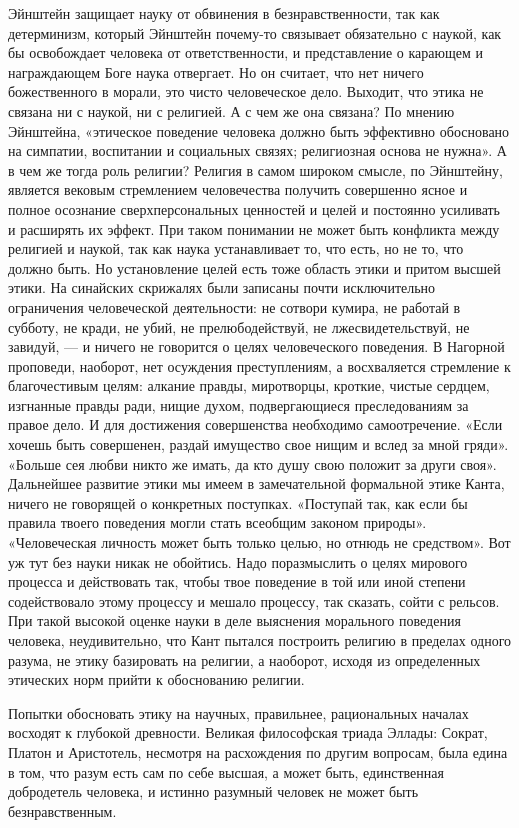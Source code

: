 Эйнштейн защищает науку от обвинения в безнравственности, так как детерминизм,
который Эйнштейн почему-то связывает обязательно с наукой, как бы освобождает
человека от ответственности, и представление о карающем и награждающем Боге
наука отвергает. Но он считает, что нет ничего божественного в морали, это
чисто человеческое дело. Выходит, что этика не связана ни с наукой, ни с
религией. А с чем же она связана? По мнению Эйнштейна, «этическое поведение
человека должно быть эффективно обосновано на симпатии, воспитании и социальных
связях; религиозная основа не нужна». А в чем же тогда роль религии? Религия в
самом широком смысле, по Эйнштейну, является вековым стремлением человечества
получить совершенно ясное и полное осознание сверхперсональных ценностей и
целей и постоянно усиливать и расширять их эффект. При таком понимании не может
быть конфликта между религией и наукой, так как наука устанавливает то, что
есть, но не то, что должно быть. Но установление целей есть тоже область этики
и притом высшей этики. На синайских
скрижалях были записаны почти исключительно ограничения человеческой
деятельности: не сотвори кумира, не работай в субботу, не кради, не убий, не
прелюбодействуй, не лжесвидетельствуй, не завидуй, --- и ничего не говорится о
целях человеческого поведения. В Нагорной проповеди, наоборот, нет осуждения
преступлениям, а восхваляется стремление к благочестивым целям: алкание правды,
миротворцы, кроткие, чистые сердцем, изгнанные правды ради, нищие духом,
подвергающиеся преследованиям за правое дело. И для достижения совершенства
необходимо самоотречение. «Если хочешь быть совершенен, раздай имущество свое
нищим и вслед за мной гряди». «Больше сея любви никто же имать, да кто душу
свою положит за други своя». Дальнейшее развитие этики мы имеем в замечательной
формальной этике Канта, ничего не говорящей о конкретных поступках. «Поступай
так, как если бы правила твоего поведения могли стать всеобщим законом
природы». «Человеческая личность может быть только целью, но отнюдь не
средством». Вот уж тут без науки никак не обойтись. Надо поразмыслить о целях
мирового процесса и действовать так, чтобы твое поведение в той или иной
степени содействовало этому процессу и мешало процессу, так сказать, сойти с
рельсов. При такой высокой оценке науки в деле выяснения морального поведения
человека, неудивительно, что Кант пытался построить религию в пределах одного
разума, не этику базировать на религии, а наоборот, исходя из определенных
этических норм прийти к обоснованию религии.

Попытки обосновать этику на научных, правильнее, рациональных началах восходят
к глубокой древности. Великая философская триада Эллады: Сократ, Платон и
Аристотель, несмотря на расхождения по другим вопросам, была едина в том, что
разум есть сам по себе высшая, а может быть, единственная добродетель человека,
и истинно разумный человек не может быть безнравственным.

